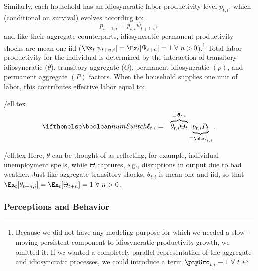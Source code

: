 \documentclass[titlepage]{\econtex}\newcommand{\texname}{cAndCwithStickyE}
\begin{document}
Similarly, each household has an idiosyncratic labor productivity level $p_{t,i}$, which (conditional on survival) evolves according to:
\begin{equation}
p_{t+1,i} = p_{t,i} \psi_{t+1,i},  \label{eq:IndRandWalk}
\end{equation}
and like their aggregate counterparts, idiosyncratic permanent productivity shocks are mean
one iid ($\Ex_{t}[\psi_{t+n,i}]=\Ex_{t}[\Psi_{t+n}]= 1~\forall ~n>0$).\footnote{Because we did not have any modeling purpose for which we needed a slow-moving persistent component to idiosyncratic productivity growth, we omitted it.  If we wanted a completely parallel representation of the aggregate and idiosyncratic processes, we could introduce a term $\ptyGro_{t,i} \equiv 1 ~\forall~t$.}
Total labor productivity for the individual is determined by the interaction of transitory idiosyncratic
($\theta$), transitory aggregate ($\Theta$), permanent idiosyncratic $({p})$, and permanent aggregate
$({P})$ factors.  When the household supplies one unit of labor, this contributes effective labor equal to:
\begin{verbatimwrite}{\eq/ell.tex}
\newcommand{\TranShocktpOne }{\Theta_{t}}
\begin{eqnarray}
  \label{eq:ell}
\ifnumSw  \pmb{\ell}_{t,i} & = & \overbrace{\theta_{t,i}\TranShocktpOne}^{\equiv\,\pmb{\theta}_{t,i}}\underbrace{{p}_{t,i} {P}_{t}}_{\equiv\,\pLev_{t,i}}.
\end{eqnarray}
\end{verbatimwrite}
 {\eq/ell.tex} Here, $\theta$ can be thought of as reflecting, for example, individual unemployment spells, while $\Theta$ captures, e.g., disruptions in output due to bad weather.  Just like aggregate transitory shocks, $\theta_{t,i}$ is mean one and iid, so that $\Ex_{t}[\theta_{t+n,i}]=\Ex_{t}[\Theta_{t+n}]=1~\forall~n>0$.  

\subsubsection{Perceptions and Behavior}
\end{document}
